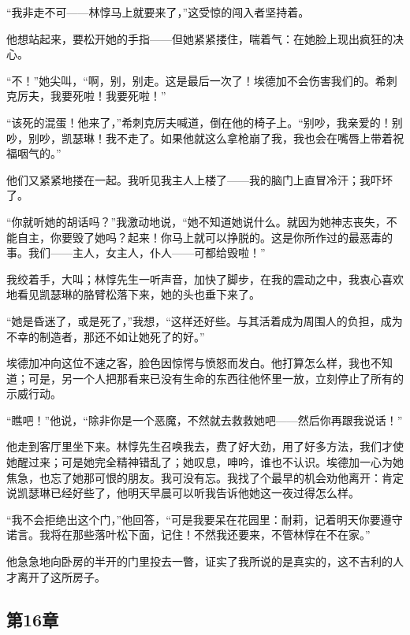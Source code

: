 \par “我非走不可——林惇马上就要来了，”这受惊的闯入者坚持着。
\par 他想站起来，要松开她的手指——但她紧紧搂住，喘着气：在她脸上现出疯狂的决心。
\par “不！”她尖叫，“啊，别，别走。这是最后一次了！埃德加不会伤害我们的。希刺克厉夫，我要死啦！我要死啦！”
\par “该死的混蛋！他来了，”希刺克厉夫喊道，倒在他的椅子上。“别吵，我亲爱的！别吵，别吵，凯瑟琳！我不走了。如果他就这么拿枪崩了我，我也会在嘴唇上带着祝福咽气的。”
\par 他们又紧紧地搂在一起。我听见我主人上楼了——我的脑门上直冒冷汗；我吓坏了。
\par “你就听她的胡话吗？”我激动地说，“她不知道她说什么。就因为她神志丧失，不能自主，你要毁了她吗？起来！你马上就可以挣脱的。这是你所作过的最恶毒的事。我们——主人，女主人，仆人——可都给毁啦！”
\par 我绞着手，大叫；林惇先生一听声音，加快了脚步，在我的震动之中，我衷心喜欢地看见凯瑟琳的胳臂松落下来，她的头也垂下来了。
\par “她是昏迷了，或是死了，”我想，“这样还好些。与其活着成为周围人的负担，成为不幸的制造者，那还不如让她死了的好。”
\par 埃德加冲向这位不速之客，脸色因惊愕与愤怒而发白。他打算怎么样，我也不知道；可是，另一个人把那看来已没有生命的东西往他怀里一放，立刻停止了所有的示威行动。
\par “瞧吧！”他说，“除非你是一个恶魔，不然就去救救她吧——然后你再跟我说话！”
\par 他走到客厅里坐下来。林惇先生召唤我去，费了好大劲，用了好多方法，我们才使她醒过来；可是她完全精神错乱了；她叹息，呻吟，谁也不认识。埃德加一心为她焦急，也忘了她那可恨的朋友。我可没有忘。我找了个最早的机会劝他离开：肯定说凯瑟琳已经好些了，他明天早晨可以听我告诉他她这一夜过得怎么样。
\par “我不会拒绝出这个门，”他回答，“可是我要呆在花园里：耐莉，记着明天你要遵守诺言。我将在那些落叶松下面，记住！不然我还要来，不管林惇在不在家。”
\par 他急急地向卧房的半开的门里投去一瞥，证实了我所说的是真实的，这不吉利的人才离开了这所房子。


\subsection{第16章}

